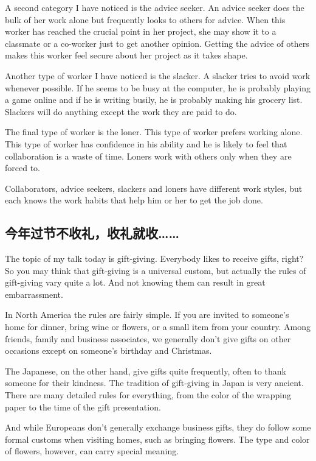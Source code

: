 A second category I have noticed is the advice seeker.
An advice seeker does the bulk of her work alone but
frequently looks to others for advice. When this worker has
reached the crucial point in her project, she may show it
to a classmate or a co-worker just to get another opinion.
Getting the advice of others makes this worker feel secure
about her project as it takes shape.

Another type of worker I have noticed is the slacker.
A slacker tries to avoid work whenever possible. If he
seems to be busy at the computer, he is probably playing
a game online and if he is writing busily, he is probably
making his grocery list. Slackers will do anything except
the work they are paid to do.

The final type of worker is the loner. This type of worker
prefers working alone. This type of worker has confidence
in his ability and he is likely to feel that collaboration is a
waste of time. Loners work with others only when
they are forced to.

Collaborators, advice seekers, slackers and loners have
different work styles, but each knows the work habits that
help him or her to get the job done.

\subsection{今年过节不收礼，收礼就收……}
The topic of my talk today is gift-giving. Everybody likes to
receive gifts, right? So you may think that gift-giving is a
universal custom, but actually the rules of gift-giving vary
quite a lot. And not knowing them can result in great embarrassment.

In North America the rules are fairly simple. If you are invited
to someone's home for dinner, bring wine or flowers,
or a small item from your country. Among friends, family
and business associates, we generally don't give gifts
on other occasions except on someone's birthday and
Christmas.

The Japanese, on the other hand, give gifts quite frequently,
often to thank someone for their kindness. The tradition
of gift-giving in Japan is very ancient. There are many
detailed rules for everything, from the color of the wrapping
paper to the time of the gift presentation.

And while Europeans don't generally exchange business
gifts, they do follow some formal customs when visiting
homes, such as bringing flowers. The type and color of
flowers, however, can carry special meaning.

